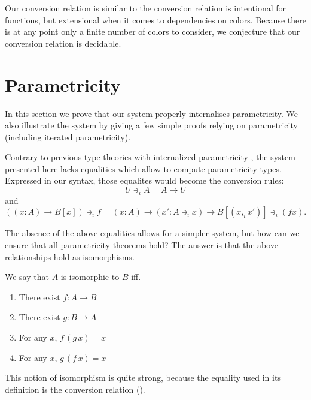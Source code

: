 \documentclass[english]{PaperTools/latex/lipics}
\newcommand\CP[3]{(#2,_{#1} #3)}
\newcommand\op[1]{∋_{#1}}
\begin{document}
Our conversion relation is similar to the conversion relation is
intentional for functions, but extensional when it comes to
dependencies on colors. Because there is at any point only a finite
number of colors to consider, we conjecture that our conversion
relation is decidable.

\section{Parametricity}
\label{sec:parametricity}
In this section we prove that our system properly internalises
parametricity. We also illustrate the system by giving a few simple
proofs relying on parametricity (including iterated parametricity).

Contrary to previous type theories with internalized parametricity
\citep{bernardy_computational_2012, bernardy_type-theory_2013}, the
system presented here lacks equalities which allow to compute
parametricity types. Expressed in our syntax, those equalites would become the conversion rules:
$$U \op i A = A → U$$
and
$$((x:A) → B[x]) \op i f = (x:A) → (x' : A \op i x) → B[\CP i x {x'}] \op i (f x).$$

The absence of the above equalities allows for a simpler system, but
how can we ensure that all parametricity theorems hold?  The answer is
that the above relationships hold as isomorphisms.

We say that $A$ is isomorphic to $B$ iff.
\begin{enumerate}
  \item There exist $f : A → B$
  \item There exist $g : B → A$
  \item For any $x$, $f\, (g\, x) = x$
  \item For any $x$, $g\, (f\, x) = x$
\end{enumerate}
This notion of isomorphism is quite strong, because the equality used
in its definition is the conversion relation ().
\end{document}
